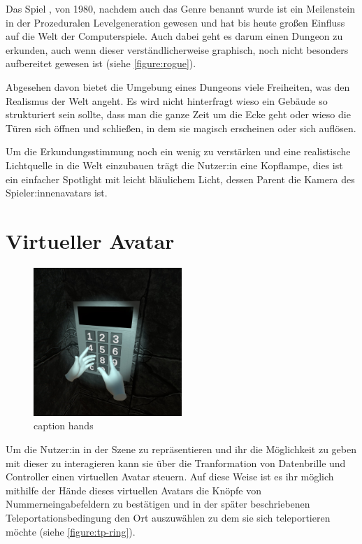 Das Spiel , von 1980, nachdem auch das Genre  benannt wurde ist ein Meilenstein in der Prozeduralen Levelgeneration gewesen und hat bis heute großen Einfluss auf die Welt der Computerspiele. Auch dabei geht es darum einen Dungeon zu erkunden, auch wenn dieser verständlicherweise graphisch, noch nicht besonders aufbereitet gewesen ist (siehe \autoref{figure:rogue}).

Abgesehen davon bietet die Umgebung eines Dungeons viele Freiheiten, was den Realismus der Welt angeht. Es wird nicht hinterfragt wieso ein Gebäude so strukturiert sein sollte, dass man die ganze Zeit um die Ecke geht oder wieso die Türen sich öffnen und schließen, in dem sie magisch erscheinen oder sich auflösen.

Um die Erkundungsstimmung noch ein wenig zu verstärken und eine realistische Lichtquelle in die Welt einzubauen trägt die Nutzer:in eine Kopflampe, dies ist ein einfacher Spotlight mit leicht bläulichem Licht, dessen Parent die Kamera des Spieler:innenavatars ist.


\section{Virtueller Avatar}

\begin{figure}[!h]
    \centering
    \includegraphics[width=0.5\textwidth]{vrscreenshots/hands.jpg}
    \caption{caption hands}\label{figure:hands}
\end{figure}

Um die Nutzer:in in der Szene zu repräsentieren und ihr die Möglichkeit zu geben mit dieser zu interagieren kann sie über die Tranformation von Datenbrille und Controller einen virtuellen Avatar steuern. Auf diese Weise ist es ihr möglich mithilfe der Hände dieses virtuellen Avatars die Knöpfe von Nummerneingabefeldern zu bestätigen und in der später beschriebenen Teleportationsbedingung den Ort auszuwählen zu dem sie sich teleportieren möchte (siehe \autoref{figure:tp-ring}).

